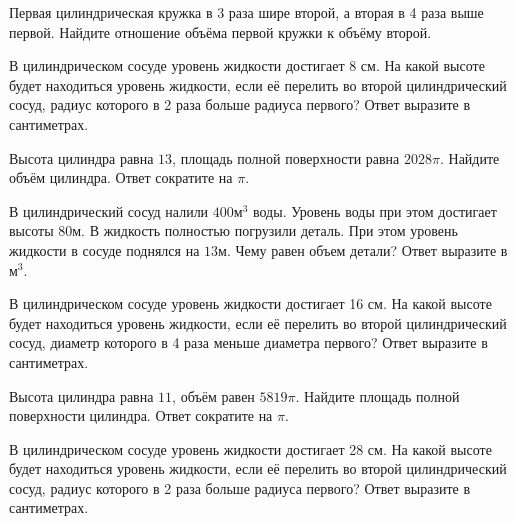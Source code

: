 \documentclass[4apaper]{article}
\begin{document}
\begin{taskBN}{36}
 Первая цилиндрическая кружка в 3 раза шире второй, а вторая в 4 раза выше первой. Найдите отношение объёма первой кружки к объёму второй.
\end{taskBN}

\begin{taskBN}{37}
В цилиндрическом сосуде уровень жидкости достигает 8 см. На какой высоте будет находиться уровень жидкости, если её перелить во второй цилиндрический сосуд, радиус которого в 2 раза больше радиуса первого? Ответ выразите в сантиметрах.
\end{taskBN}

\begin{taskBN}{38}
Высота цилиндра равна $13$, площадь полной поверхности равна $2028\pi$. Найдите объём цилиндра. Ответ сократите на $\pi$.
\end{taskBN}

\begin{taskBN}{39}
В цилиндрический сосуд налили $400\mbox{м}^3$ воды. Уровень воды при этом достигает высоты $80$м. В жидкость полностью погрузили деталь. При этом уровень жидкости в сосуде поднялся на $13$м. Чему равен объем детали? Ответ выразите в $\mbox{м}^3$.
\end{taskBN}

\begin{taskBN}{40}
В цилиндрическом сосуде уровень жидкости достигает 16 см. На какой высоте будет находиться уровень жидкости, если её перелить во второй цилиндрический сосуд, диаметр которого в 4 раза меньше диаметра первого? Ответ выразите в сантиметрах.
\end{taskBN}

\begin{taskBN}{41}
Высота цилиндра равна $11$, объём равен $5819\pi$. Найдите площадь полной поверхности цилиндра. Ответ сократите на $\pi$.
\end{taskBN}

\begin{taskBN}{42}
В цилиндрическом сосуде уровень жидкости достигает 28 см. На какой высоте будет находиться уровень жидкости, если её перелить во второй цилиндрический сосуд, радиус которого в 2 раза больше радиуса первого? Ответ выразите в сантиметрах.
\end{taskBN}
\end{document}
